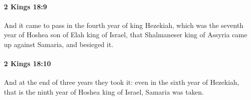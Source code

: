 		\paragraph{2 Kings 18:9} %
			\label{2KINGS-18-9}

			And it came to pass in the fourth year of king Hezekiah, which was the seventh year of Hoshea son of Elah king of Israel, that Shalmaneser king of Assyria came up against Samaria, and besieged it.


		\paragraph{2 Kings 18:10} %
			\label{2KINGS-18-10}

			And at the end of three years they took it: even in the sixth year of Hezekiah, that is the ninth year of Hoshea king of Israel, Samaria was taken.


